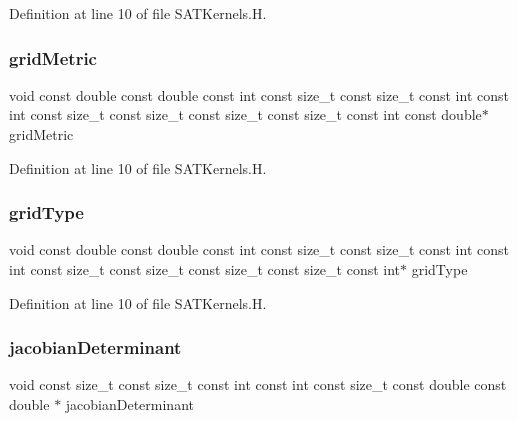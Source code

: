 Definition at line 10 of file S\+A\+T\+Kernels.\+H.

\hypertarget{SATKernels_8H_a958e0724b892fe1870c5f76f17abb768}{}\label{SATKernels_8H_a958e0724b892fe1870c5f76f17abb768} 
\subsubsection{\texorpdfstring{grid\+Metric}{gridMetric}}
{\footnotesize\ttfamily void const double const double const int const size\+\_\+t const size\+\_\+t const int const int const size\+\_\+t const size\+\_\+t const size\+\_\+t const size\+\_\+t const int const double$\ast$ grid\+Metric}



Definition at line 10 of file S\+A\+T\+Kernels.\+H.

\hypertarget{SATKernels_8H_aa9206cf7d7248907b29e016938842a7a}{}\label{SATKernels_8H_aa9206cf7d7248907b29e016938842a7a} 
\subsubsection{\texorpdfstring{grid\+Type}{gridType}}
{\footnotesize\ttfamily void const double const double const int const size\+\_\+t const size\+\_\+t const int const int const size\+\_\+t const size\+\_\+t const size\+\_\+t const size\+\_\+t const int$\ast$ grid\+Type}



Definition at line 10 of file S\+A\+T\+Kernels.\+H.

\hypertarget{SATKernels_8H_af927ee3df09e556d50c34f0e1d279a8c}{}\label{SATKernels_8H_af927ee3df09e556d50c34f0e1d279a8c} 
\subsubsection{\texorpdfstring{jacobian\+Determinant}{jacobianDeterminant}}
{\footnotesize\ttfamily void const size\+\_\+t const size\+\_\+t const int const int const size\+\_\+t const double const double $\ast$ jacobian\+Determinant}



